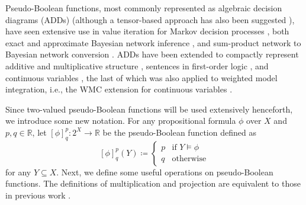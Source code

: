 Pseudo-Boolean functions, most commonly represented as
algebraic decision diagrams (ADDs) \citep{DBLP:journals/fmsd/BaharFGHMPS97}
(although a tensor-based approach has also been suggested
\citep{DBLP:journals/corr/abs-1908-04381,DBLP:conf/cp/DudekPV20}), have seen
extensive use in value iteration for Markov decision processes
\citep{DBLP:conf/uai/HoeySHB99}, both exact and approximate Bayesian network
inference \citep{DBLP:conf/ijcai/ChaviraD07,DBLP:conf/uai/GogateD11}, and
sum-product network \citep{DBLP:conf/uai/PoonD11} to Bayesian network conversion
\citep{DBLP:conf/icml/ZhaoMP15}. ADDs have been extended to compactly represent
additive and multiplicative structure \citep{DBLP:conf/ijcai/SannerM05},
sentences in first-order logic \citep{DBLP:journals/ai/SannerB09}, and continuous
variables \citep{DBLP:conf/uai/SannerDB11}, the last of which was also applied to
weighted model integration, i.e., the WMC extension for continuous variables
\citep{DBLP:conf/ijcai/BellePB15,DBLP:conf/ijcai/KolbMSBK18}.

Since two-valued pseudo-Boolean functions will be used extensively henceforth,
we introduce some new notation. For any propositional formula $\phi$ over $X$
and $p, q \in \mathbb{R}$, let $[\phi]^p_q\colon 2^X \to \mathbb{R}$ be the
pseudo-Boolean function defined as
\[
  [\phi]^p_q(Y) \coloneqq
  \begin{cases}
    p & \text{if } Y \models \phi \\
    q & \text{otherwise}
  \end{cases}
\]
for any $Y \subseteq X$. Next, we define some useful operations on
pseudo-Boolean functions. The definitions of multiplication and projection are
equivalent to those in previous work
\citep{DBLP:conf/aaai/DudekPV20,DBLP:conf/cp/DudekPV20}.

